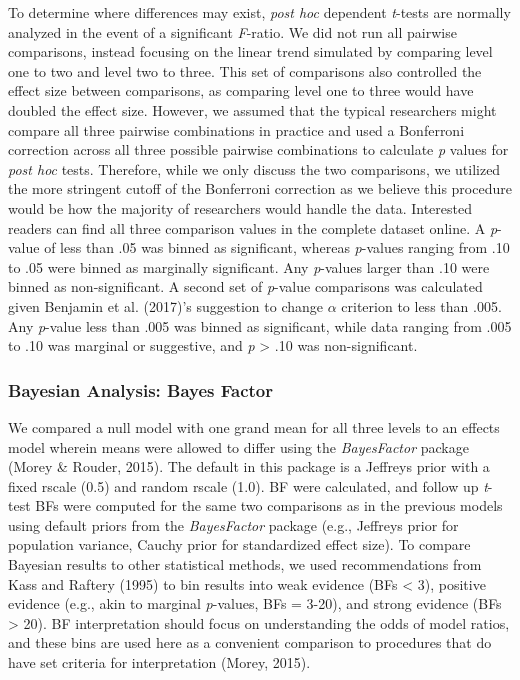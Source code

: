 \documentclass[english,man]{apa6}
\theoremstyle{definition}
\theoremstyle{definition}
\theoremstyle{definition}
\theoremstyle{remark}
\begin{document}
To determine where differences may exist, \emph{post hoc} dependent
\emph{t}-tests are normally analyzed in the event of a significant
\emph{F}-ratio. We did not run all pairwise comparisons, instead
focusing on the linear trend simulated by comparing level one to two and
level two to three. This set of comparisons also controlled the effect
size between comparisons, as comparing level one to three would have
doubled the effect size. However, we assumed that the typical
researchers might compare all three pairwise combinations in practice
and used a Bonferroni correction across all three possible pairwise
combinations to calculate \emph{p} values for \emph{post hoc} tests.
Therefore, while we only discuss the two comparisons, we utilized the
more stringent cutoff of the Bonferroni correction as we believe this
procedure would be how the majority of researchers would handle the
data. Interested readers can find all three comparison values in the
complete dataset online. A \emph{p}-value of less than .05 was binned as
significant, whereas \emph{p}-values ranging from .10 to .05 were binned
as marginally significant. Any \emph{p}-values larger than .10 were
binned as non-significant. A second set of \emph{p}-value comparisons
was calculated given Benjamin et al. (2017)'s suggestion to change
\(\alpha\) criterion to less than .005. Any \emph{p}-value less than
.005 was binned as significant, while data ranging from .005 to .10 was
marginal or suggestive, and \emph{p} \textgreater{} .10 was
non-significant.

\subsubsection{Bayesian Analysis: Bayes
Factor}\label{bayesian-analysis-bayes-factor}

We compared a null model with one grand mean for all three levels to an
effects model wherein means were allowed to differ using the
\emph{BayesFactor} package (Morey \& Rouder, 2015). The default in this
package is a Jeffreys prior with a fixed rscale (0.5) and random rscale
(1.0). BF were calculated, and follow up \emph{t}-test BFs were computed
for the same two comparisons as in the previous models using default
priors from the \emph{BayesFactor} package (e.g., Jeffreys prior for
population variance, Cauchy prior for standardized effect size). To
compare Bayesian results to other statistical methods, we used
recommendations from Kass and Raftery (1995) to bin results into weak
evidence (BFs \textless{} 3), positive evidence (e.g., akin to marginal
\emph{p}-values, BFs = 3-20), and strong evidence (BFs \textgreater{}
20). BF interpretation should focus on understanding the odds of model
ratios, and these bins are used here as a convenient comparison to
procedures that do have set criteria for interpretation (Morey, 2015).
\end{document}
